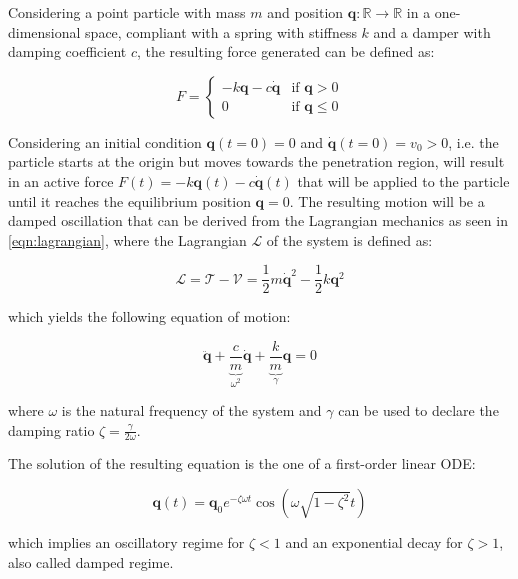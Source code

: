 Considering a point particle with mass $m$ and position $\mathbf{q}: \mathbb{R} \rightarrow \mathbb{R}$ in a one-dimensional space, compliant with a spring with stiffness $k$ and a damper with damping coefficient $c$, the resulting force generated can be defined as:

\begin{equation}
    F = \begin{cases}
        -k\mathbf{q} - c\dot{\mathbf{q}} & \text{if } \mathbf{q} > 0    \\
        0                                & \text{if } \mathbf{q} \leq 0
    \end{cases}
\end{equation}

Considering an initial condition $\mathbf{q}(t=0) = 0$ and $\dot{\mathbf{q}}(t=0) = v_0 > 0$, i.e. the particle starts at the origin but moves towards the penetration region, will result in an active force $F(t) = -k\mathbf{q}(t) - c\dot{\mathbf{q}}(t)$ that will be applied to the particle until it reaches the equilibrium position $\mathbf{q} = 0$. The resulting motion will be a damped oscillation that can be derived from the Lagrangian mechanics as seen in \cref{eqn:lagrangian}, where the Lagrangian $\mathcal{L}$ of the system is defined as:

\begin{equation}
    \mathcal{L} = \mathcal{T} - \mathcal{V} = \frac{1}{2}m\dot{\mathbf{q}}^2 - \frac{1}{2}k\mathbf{q}^2
\end{equation}

which yields the following equation of motion:

\begin{equation}
    \ddot{\mathbf{q}} + \underbrace{\frac{c}{m}} _{\omega ^2} \dot{\mathbf{q}} + \underbrace{\frac{k}{m}} _\gamma \mathbf{q} = 0
\end{equation}

where $\omega$ is the natural frequency of the system and $\gamma$ can be used to declare the damping ratio $\zeta = \frac{\gamma}{2\omega}$.

The solution of the resulting equation is the one of a first-order linear \ac{ODE}:

\begin{equation}
    \mathbf{q}(t) = \mathbf{q}_0 e^{-\zeta \omega t} \cos(\omega \sqrt{1 - \zeta ^2} t)
\end{equation}

which implies an oscillatory regime for $\zeta < 1$ and an exponential decay for $\zeta > 1$, also called damped regime.

